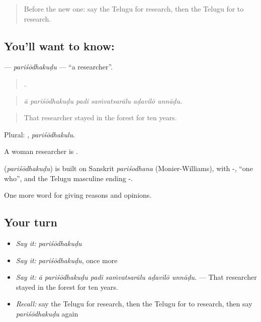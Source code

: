 \label{lesson:TE-C412-parisodhakudu}



\begin{quote}
Before the new one: say the Telugu for research, then the Telugu for to research.
\end{quote}

\subsection*{You'll want to know: }
\textbf{} — \emph{pariśōdhakuḍu} — \textquotedblleft{}a researcher\textquotedblright{}.

\begin{quote}
     .
\end{quote}

\begin{quote}
\emph{ā pariśōdhakuḍu padi saṁvatsarālu aḍavilō unnāḍu.}
\end{quote}

\begin{quote}
That researcher stayed in the forest for ten years.
\end{quote}

Plural: , \emph{pariśōdhakulu}.

A woman researcher is .

\begin{cousinweb}
\textbf{} (\emph{pariśōdhakuḍu}) is built on Sanskrit \emph{pariśodhana} (Monier-Williams), with -, \textquotedblleft{}one who\textquotedblright{}, and the Telugu masculine ending -.
\end{cousinweb}

\begin{grammarlens}[title={What you've built}]
One more word for giving reasons and opinions.
\end{grammarlens}

\subsection*{Your turn}
\begin{itemize}
\raggedright
  \item \emph{Say it:} \emph{pariśōdhakuḍu}
  \item \emph{Say it:} \emph{pariśōdhakuḍu}, once more
  \item \emph{Say it:} \emph{ā pariśōdhakuḍu padi saṁvatsarālu aḍavilō unnāḍu.} — That researcher stayed in the forest for ten years.
  \item \emph{Recall:} say the Telugu for research, then the Telugu for to research, then say \emph{pariśōdhakuḍu} again
\end{itemize}

